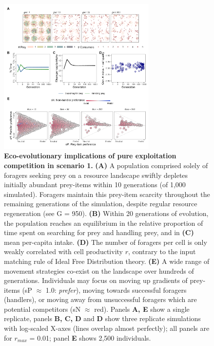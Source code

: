 \begin{figure}[t!]
    \centering
    \includegraphics[width=0.7\textwidth]{figures/kleptomove/fig_01.png}
    \caption{
        \textbf{Eco-evolutionary implications of pure exploitation competition in scenario 1.}
        \textbf{(A)} A population comprised solely of foragers seeking prey on a resource landscape swiftly depletes initially abundant prey-items within 10 generations (of 1,000 simulated).
        Foragers maintain this prey-item scarcity throughout the remaining generations of the simulation, despite regular resource regeneration (see G = 950).
        \textbf{(B)} Within 20 generations of evolution, the population reaches an equilibrium in the relative proportion of time spent on searching for prey and handling prey, and in \textbf{(C)} mean per-capita intake.
        \textbf{(D)} The number of foragers per cell is only weakly correlated with cell productivity $r$, contrary to the input matching rule of Ideal Free Distribution theory.
        \textbf{(E)} A wide range of movement strategies co-exist on the landscape over hundreds of generations.
        Individuals may focus on moving up gradients of prey-items (sP $\approx$ 1.0: \textit{prefer}), moving towards successful foragers (handlers), or moving away from unsuccessful foragers which are potential competitors (sN $\approx$ red).
        Panels \textbf{A, E} show a single replicate, panels \textbf{B, C, D} and \textbf{D} show three replicate simulations with log-scaled X-axes (lines overlap almost perfectly); all panels are for $r_{max}$ = 0.01; panel \textbf{E} shows 2,500 individuals.
    }
    \label{klepto_fig_01}
\end{figure}

